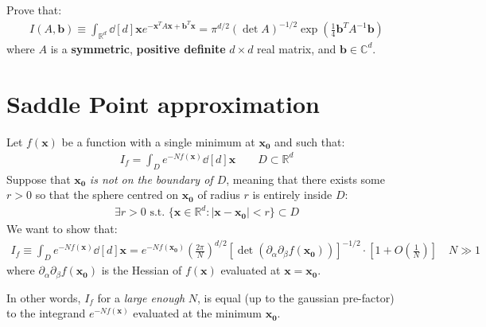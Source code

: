 \documentclass[../template.tex]{subfiles}
\begin{document}
\begin{exo}[Generalization]
    Prove that:
    \begin{align*}
        I(A,\bm{b}) \equiv \int_{\mathbb{R}^d} \dd[d]{\bm{x}} e^{-\bm{x}^T A \bm{x} + \bm{b}^T \bm{x}} = \pi^{d/2} (\operatorname{det}A)^{-1/2} \exp\left(\frac{1}{4} \bm{b}^T A^{-1} \bm{b} \right)
    \end{align*}
    where $A$ is a \textbf{symmetric}, \textbf{positive definite} $d\times d$ real matrix, and $\bm{b} \in \mathbb{C}^d$.  
\end{exo}

\section{Saddle Point approximation}
Let $f(\bm{x})$ be a function with a single minimum at $\bm{x_0}$ and such that:
\begin{align*}
    I_f = \int_{D} e^{-N f(\bm{x})} \dd[d]{\bm{x}} \qquad D \subset \mathbb{R}^d
\end{align*}
Suppose that $\bm{x_0}$ \textit{is not on the boundary of $D$}, meaning that there exists some $r > 0$ so that the sphere centred on $\bm{x_0}$ of radius $r$ is entirely inside $D$:
\begin{align*}
    \exists r > 0 \text{ s.t. }\{\bm{x} \in \mathbb{R}^d \colon |\bm{x}-\bm{x_0}| < r\} \subset D
\end{align*} 
We want to show that:
\begin{align}\label{eqn:saddle-point}
    I_f \equiv \int_D e^{-N f(\bm{x})} \dd[d]{\bm{x}} = e^{-N f(\bm{x_0})} \left(\frac{2\pi}{N} \right)^{d/2} [\operatorname{det}(\partial_\alpha\partial_\beta f(\bm{x_0})) ]^{-1/2} \cdot \left[1+O\left(\frac{1}{N} \right)\right] \quad N \gg 1
\end{align}
where $\partial_\alpha \partial_\beta f(\bm{x_0})$ is the Hessian of $f(\bm{x})$ evaluated at $\bm{x} = \bm{x_0}$.

In other words, $I_f$ for a \textit{large enough} $N$, is equal (up to the gaussian pre-factor) to the integrand $e^{-N f(\bm{x})}$ evaluated at the minimum $\bm{x_0}$.

\medskip
\end{document}
